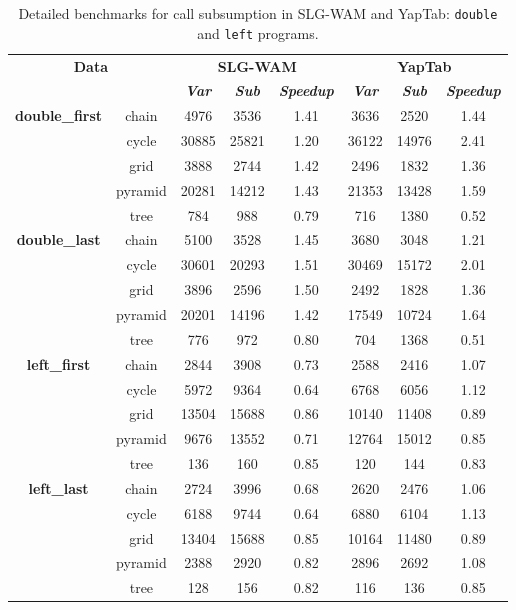 \begin{table}[ht]
\centering
\footnotesize{
  \begin{tabular}{cc|ccc|ccc}
   \hline
    \hline
    \multicolumn{2}{c|}{\multirow{2}{*}{\small{\textbf{Data}}}} & \multicolumn{3}{c|}{\small{\textbf{SLG-WAM}}} & \multicolumn{3}{c}{\small{\textbf{YapTab}}} \\
     \multicolumn{2}{c|}{} & \textbf{\textit{Var}} & \textbf{\textit{Sub}} & \textbf{\textit{Speedup}} & \textbf{\textit{Var}} & \textbf{\textit{Sub}} & \textbf{\textit{Speedup}} \\
   \hline
   \hline
\multirow{5}{*}{\textbf{double\_first}} &  \scriptsize{chain}  &  4976 & 3536 &  1.41  & 3636 & 2520 &  1.44 \\
&  \scriptsize{cycle}  &  30885 & 25821 &  1.20  & 36122 & 14976 &  2.41 \\
&  \scriptsize{grid}  &  3888 & 2744 &  1.42  & 2496 & 1832 &  1.36 \\
&  \scriptsize{pyramid}  &  20281 & 14212 &  1.43  & 21353 & 13428 &  1.59 \\
&  \scriptsize{tree}  &  784 & 988 &  0.79  & 716 & 1380 &  0.52 \\
\hline
\multirow{5}{*}{\textbf{double\_last}} &  \scriptsize{chain}  &  5100 & 3528 &  1.45  & 3680 & 3048 &  1.21 \\
&  \scriptsize{cycle}  &  30601 & 20293 &  1.51  & 30469 & 15172 &  2.01 \\
&  \scriptsize{grid}  &  3896 & 2596 &  1.50  & 2492 & 1828 &  1.36 \\
&  \scriptsize{pyramid}  &  20201 & 14196 &  1.42  & 17549 & 10724 &  1.64 \\
&  \scriptsize{tree}  &  776 & 972 &  0.80  & 704 & 1368 &  0.51 \\
\hline
\multirow{5}{*}{\textbf{left\_first}} &  \scriptsize{chain}  &  2844 & 3908 &  0.73  & 2588 & 2416 &  1.07 \\
&  \scriptsize{cycle}  &  5972 & 9364 &  0.64  & 6768 & 6056 &  1.12 \\
&  \scriptsize{grid}  &  13504 & 15688 &  0.86  & 10140 & 11408 &  0.89 \\
&  \scriptsize{pyramid}  &  9676 & 13552 &  0.71  & 12764 & 15012 &  0.85 \\
&  \scriptsize{tree}  &  136 & 160 &  0.85  & 120 & 144 &  0.83 \\
\hline
\multirow{5}{*}{\textbf{left\_last}} &  \scriptsize{chain}  &  2724 & 3996 &  0.68  & 2620 & 2476 &  1.06 \\
&  \scriptsize{cycle}  &  6188 & 9744 &  0.64  & 6880 & 6104 &  1.13 \\
&  \scriptsize{grid}  &  13404 & 15688 &  0.85  & 10164 & 11480 &  0.89 \\
&  \scriptsize{pyramid}  &  2388 & 2920 &  0.82  & 2896 & 2692 &  1.08 \\
&  \scriptsize{tree}  &  128 & 156 &  0.82  & 116 & 136 &  0.85 \\
\hline
\hline
\end{tabular}
}
\caption{Detailed benchmarks for call subsumption in SLG-WAM and YapTab: \texttt{double} and \texttt{left} programs.}
\label{tbl:result_path_detail1}
\end{table}



